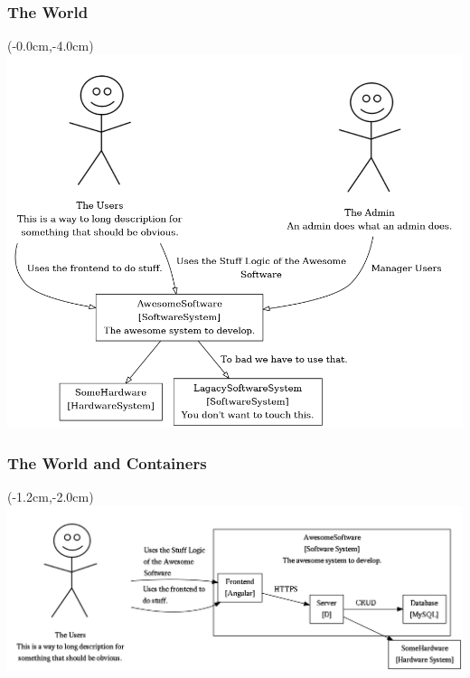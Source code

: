 \documentclass[xelatex,10pt]{beamer}
\begin{document}
\begin{frame}
	\frametitle{The World}
	\begin{textblock*}{0cm}(-0.0cm,-4.0cm)
		\centering
		\includegraphics[width=0.8\paperwidth]{systemcontext.png}
	\end{textblock*}
\end{frame}

\begin{frame}
	\frametitle{The World and Containers}
	\begin{textblock*}{0cm}(-1.2cm,-2.0cm)
		\includegraphics[width=1.0\paperwidth]{theworldandcontainer.png}
	\end{textblock*}
\end{frame}
\end{document}
